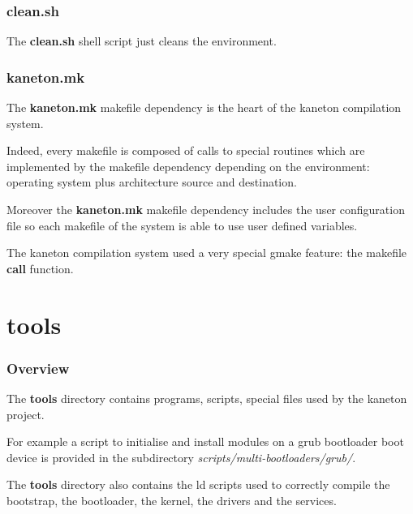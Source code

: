 \documentclass[8pt]{beamer}
\newcommand{\nl}[0]{\vspace{0.4cm}}
\begin{document}

\begin{frame}
  \frametitle{clean.sh}

  The \textbf{clean.sh} shell script just cleans the environment.
\end{frame}


\begin{frame}
  \frametitle{kaneton.mk}

  The \textbf{kaneton.mk} makefile dependency is the heart of the
  kaneton compilation system.

  \nl

  Indeed, every makefile is composed of calls to special routines
  which are implemented by the makefile dependency depending on the
  environment: operating system plus architecture source and destination.

  \nl

  Moreover the \textbf{kaneton.mk} makefile dependency includes the
  user configuration file so each makefile of the system is able to
  use user defined variables.

  \nl

  The kaneton compilation system used a very special gmake feature:
  the makefile \textbf{call} function.
\end{frame}

%
%

\section{tools}


\begin{frame}
  \frametitle{Overview}

  The \textbf{tools} directory contains programs, scripts, special
  files used by the kaneton project.

  \nl

  For example a script to initialise and install modules on a grub
  bootloader boot device is provided in the subdirectory
  \textit{scripts/multi-bootloaders/grub/}.

  \nl

  The \textbf{tools} directory also contains the ld scripts used
  to correctly compile the bootstrap, the bootloader, the kernel, the
  drivers and the services.
\end{frame}

\end{document}
